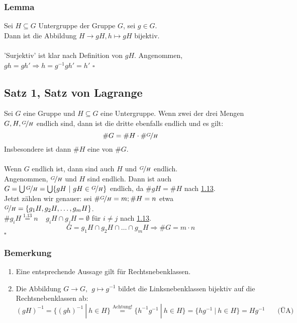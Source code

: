 \subsubsection*{Lemma}
Sei $H\subseteq G$ Untergruppe der Gruppe $G$, sei $g \in G$.\\
Dann ist die Abbildung $H \to gH, h \mapsto gH$ bijektiv.\\

\\
'Surjektiv' ist klar nach Definition von $gH$. 
Angenommen, $gh=gh' \Rightarrow h=g^{-1}gh'=h'$
\hfill $\square$

\subsection{Satz 1, Satz von Lagrange}
\label{sub:satz_von_lagrange}
Sei $G$ eine Gruppe und $H\subseteq G$ eine Untergruppe. 
Wenn zwei der drei Mengen $G,H,\nicefrac{G}{H}$ endlich sind, dann ist die dritte ebenfalls endlich und es gilt:\\
\[
\#G=\#H \cdot \#\nicefrac{G}{H} 
\]
Insbesondere ist dann $\#H$ eine  von $\#G$.\\
\vfill
{}\\
Wenn $G$ endlich ist, dann sind auch $H$ und $\nicefrac{G}{H}$ endlich.\\
Angenommen, $\nicefrac{G}{H}$ und $H$ sind endlich. Dann ist auch $G= \bigcup \nicefrac{G}{H}=\bigcup\{gH~|~gH\in \nicefrac{G}{H} \}$ endlich, da $\#gH=\#H$ nach \hyperref[sub:nebenklassen]{1.13}.\\
Jetzt zählen wir genauer: sei $\#\nicefrac{G}{H}=m; \#H=n$ etwa $\nicefrac{G}{H}=\{g_1H,g_2H, \dots , g_mH \}$.\\
$\#g_iH\stackrel{\hyperref[sub:nebenklassen]{1.13}}{=}n~~~~~g_iH\cap g_jH=\emptyset$ für $i\not=j$ nach \hyperref[sub:nebenklassen]{1.13}.\\
\[
G=g_1H\cap g_2H\cap \dots \cap g_mH \Rightarrow \#G=m\cdot n
\]
\hfill $\square$

\subsubsection*{Bemerkung}
\begin{enumerate}[(1)]
	\item Eine entsprechende Aussage gilt für Rechtsnebenklassen.
	\item Die Abbildung $G \to G,~~g\mapsto g^{-1}$ bildet die Linksnebenklassen bijektiv auf die Rechtsnebenklassen ab:
	\[
	(gH)^{-1}=\{(gh)^{-1}~|~h \in H \} \stackrel{\text{Achtung!}}{=}\{h^{-1}g^{-1}~|~h \in H \}=\{hg^{-1}~|~h\in H \}=Hg^{-1}~~~~~~~~\text{(ÜA)}
	\]
\end{enumerate}

